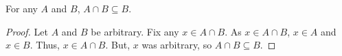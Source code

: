 \guard




\begin{prop}
\label{prop:intersectionIsSubadditive}
  For any $A$ and $B$, $A\cap B\subseteq B$.
\end{prop}
\begin{proof}
  Let $A$ and $B$ be arbitrary.
  Fix any $x\in A\cap B$.
  As $x\in A\cap B$, $x\in A$ and $x\in B$.
  Thus, $x\in A\cap B$.
  But, $x$ was arbitrary, so $A\cap B\subseteq B$.
\end{proof}
